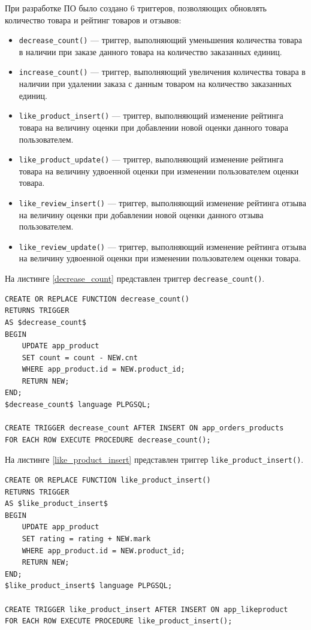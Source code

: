 При разработке ПО было создано 6 триггеров, позволяющих обновлять количество товара и рейтинг товаров и отзывов:

\begin{itemize}
	\item \verb;decrease_count(); --- триггер, выполняющий уменьшения количества товара в наличии при заказе данного товара на количество заказанных единиц.
	\item \verb;increase_count(); --- триггер, выполняющий увеличения количества товара в наличии при удалении заказа с данным товаром на количество заказанных единиц.
	\item \verb;like_product_insert(); --- триггер, выполняющий изменение рейтинга товара на величину оценки при добавлении новой оценки данного товара пользователем.
	\item \verb;like_product_update(); --- триггер, выполняющий изменение рейтинга товара на величину удвоенной оценки при изменении пользователем оценки товара.
	\item \verb;like_review_insert(); --- триггер, выполняющий изменение рейтинга отзыва на величину оценки при добавлении новой оценки данного отзыва пользователем.
	\item \verb;like_review_update(); --- триггер, выполняющий изменение рейтинга отзыва на величину удвоенной оценки при изменении пользователем оценки товара.
\end{itemize}

На листинге \ref{decrease_count} представлен триггер \verb;decrease_count();.

\captionsetup{singlelinecheck = false, justification=raggedright}
\begin{lstlisting}[label=decrease_count,caption=Триггер на уменьшение количества товаров]
CREATE OR REPLACE FUNCTION decrease_count()
RETURNS TRIGGER
AS $decrease_count$
BEGIN
    UPDATE app_product 
    SET count = count - NEW.cnt
    WHERE app_product.id = NEW.product_id;
    RETURN NEW;
END;
$decrease_count$ language PLPGSQL;

CREATE TRIGGER decrease_count AFTER INSERT ON app_orders_products
FOR EACH ROW EXECUTE PROCEDURE decrease_count();
\end{lstlisting}

На листинге \ref{like_product_insert} представлен триггер \verb;like_product_insert();.

\captionsetup{singlelinecheck = false, justification=raggedright}
\begin{lstlisting}[label=like_product_insert,caption=Триггер на изменение рейтинга при добавлении оценки]
CREATE OR REPLACE FUNCTION like_product_insert()
RETURNS TRIGGER
AS $like_product_insert$
BEGIN
    UPDATE app_product 
    SET rating = rating + NEW.mark
    WHERE app_product.id = NEW.product_id;
    RETURN NEW;
END;
$like_product_insert$ language PLPGSQL;

CREATE TRIGGER like_product_insert AFTER INSERT ON app_likeproduct
FOR EACH ROW EXECUTE PROCEDURE like_product_insert();
\end{lstlisting}

